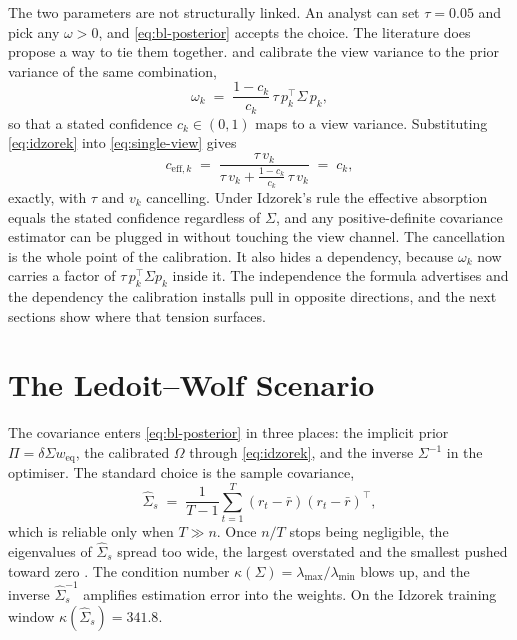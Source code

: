 \documentclass[a4paper,11pt]{article}
\theoremstyle{plain}
\theoremstyle{definition}
\newcommand{\eff}{\mathrm{eff}}
\begin{document}
The two parameters are not structurally linked. An analyst can set $\tau = 0.05$
and pick any $\omega > 0$, and \eqref{eq:bl-posterior} accepts the choice. The
literature does propose a way to tie them together. \citet{HeLitterman1999} and
\citet{Idzorek2004} calibrate the view variance to the prior variance of the same
combination,
\begin{equation}
\label{eq:idzorek}
  \omega_k \;=\; \frac{1 - c_k}{c_k}\,\tau\,p_k^\top\Sigma\,p_k ,
\end{equation}
so that a stated confidence $c_k \in (0,1)$ maps to a view variance. Substituting
\eqref{eq:idzorek} into \eqref{eq:single-view} gives
\begin{equation}
\label{eq:cancel}
  c_{\eff,k}
  \;=\; \frac{\tau\,v_k}{\tau\,v_k + \tfrac{1-c_k}{c_k}\,\tau\,v_k}
  \;=\; c_k ,
\end{equation}
exactly, with $\tau$ and $v_k$ cancelling. Under Idzorek's rule the effective
absorption equals the stated confidence regardless of $\Sigma$, and any
positive-definite covariance estimator can be plugged in without touching the
view channel. The cancellation is the whole point of the calibration. It also
hides a dependency, because $\omega_k$ now carries a factor of $\tau\,p_k^\top\Sigma p_k$
inside it. The independence the formula advertises and the dependency the
calibration installs pull in opposite directions, and the next sections show
where that tension surfaces.

\section{The Ledoit--Wolf Scenario}
\label{sec:lw}

The covariance enters \eqref{eq:bl-posterior} in three places: the implicit
prior $\Pi = \delta\Sigma w_{\mathrm{eq}}$, the calibrated $\Omega$ through
\eqref{eq:idzorek}, and the inverse $\Sigma^{-1}$ in the optimiser. The standard
choice is the sample covariance,
\[
  \hat\Sigma_s \;=\; \frac{1}{T-1}\sum_{t=1}^T (r_t - \bar r)(r_t - \bar r)^\top ,
\]
which is reliable only when $T \gg n$. Once $n/T$ stops being negligible, the
eigenvalues of $\hat\Sigma_s$ spread too wide, the largest overstated and the
smallest pushed toward zero \citep[][p.~1--2]{LedoitWolf2004}. The condition
number $\kappa(\Sigma) = \lambda_{\max}/\lambda_{\min}$ blows up, and the inverse
$\hat\Sigma_s^{-1}$ amplifies estimation error into the weights. On the Idzorek
training window $\kappa(\hat\Sigma_s) = 341.8$.
\end{document}
